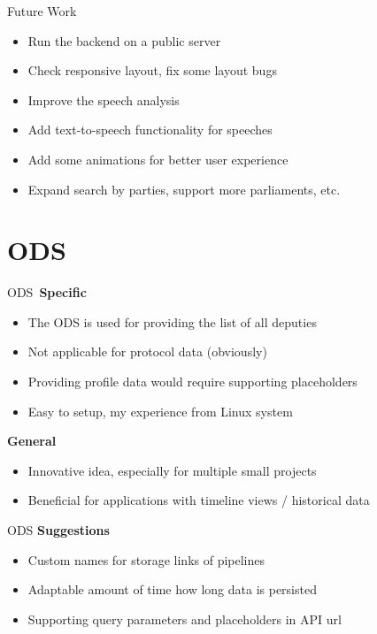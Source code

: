 \documentclass{beamer}
\begin{document}
  \begin{frame}[plain]{Future Work}
    \begin{itemize}
      \item[\footnotesize{\faWarning}]\enspace{}Run the backend on a public server
      \item[\footnotesize{\faWarning}]\enspace{}Check responsive layout, fix some layout bugs
      \item[\footnotesize{\faStar}]\enspace{}Improve the speech analysis
      \item[\footnotesize{\faStar}]\enspace{}Add text-to-speech functionality for speeches
      \item[\footnotesize{\faStar}]\enspace{}Add some animations for better user experience
      \item[\footnotesize{\faStar}]\enspace{}Expand search by parties, support more parliaments, etc. 
    \end{itemize}
  \end{frame}

  \section{ODS}
  \begin{frame}[plain]{ODS}
    \,\textbf{\faUser}\quad\textbf{Specific}
    \begin{itemize}
      \item The ODS is used for providing the list of all deputies
      \item Not applicable for protocol data (obviously)
      \item Providing profile data would require supporting placeholders
      \item Easy to setup, my experience from Linux system
    \end{itemize}
    \textbf{\faUsers}\quad\textbf{General}
    \begin{itemize}
      \item Innovative idea, especially for multiple small projects
      \item Beneficial for applications with timeline views / historical data 
    \end{itemize} 
  \end{frame}

  \begin{frame}[plain]{ODS}
    \textbf{\faThumbsUp}\quad\textbf{Suggestions}
    \begin{itemize}
      \item Custom names for storage links of pipelines
      \item Adaptable amount of time how long data is persisted
      \item Supporting query parameters and placeholders in API url 
    \end{itemize} 
  \end{frame}
\end{document}
